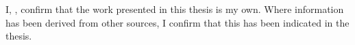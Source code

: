\thispagestyle{empty}
I, {\theauthor}, confirm that the work presented in this thesis is my own. Where information has been derived from other sources, I confirm that this has been indicated in the thesis.